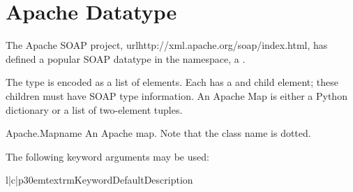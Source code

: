 \section{Apache Datatype}

The Apache SOAP project, url{http://xml.apache.org/soap/index.html},
has defined a popular SOAP datatype in the 
 namespace, a
.

The  type is encoded as a list of  elements.
Each  has a  and  child element; these
children must have SOAP type information.
An Apache Map is either a Python dictionary or a list of two-element
tuples.

\begin{classdesc}{Apache.Map}{name}
An Apache map.
Note that the class name is dotted.
\end{classdesc}

The following keyword arguments may be used:

\begin{tableiii}{l|c|p{30em}}{textrm}{Keyword}{Default}{Description}
\end{tableiii}
